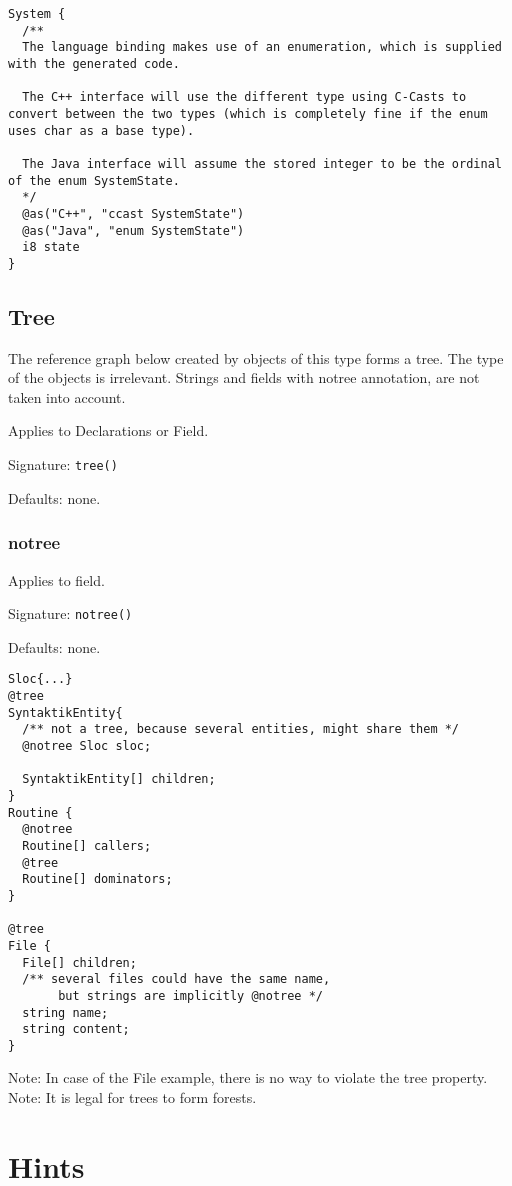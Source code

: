 \documentclass[a4paper,10pt]{article}
\begin{document}
\begin{lstlisting}[label=ascriptionExample,caption=Examples,language=skill]
System {
  /**
  The language binding makes use of an enumeration, which is supplied with the generated code.
  
  The C++ interface will use the different type using C-Casts to convert between the two types (which is completely fine if the enum uses char as a base type).
  
  The Java interface will assume the stored integer to be the ordinal of the enum SystemState.
  */
  @as("C++", "ccast SystemState")
  @as("Java", "enum SystemState")
  i8 state
}
\end{lstlisting}



\subsection*{Tree}
The reference graph below created by objects of this type forms a tree. The type of the objects is irrelevant. Strings and fields with notree annotation, are not taken into account.

Applies to Declarations or Field.

Signature: \verb/tree()/

Defaults: none.


\subsubsection*{notree}
Applies to field.

Signature: \verb/notree()/

Defaults: none.

\begin{lstlisting}[label=treeExample,caption=Examples,language=skill]
Sloc{...}
@tree
SyntaktikEntity{
  /** not a tree, because several entities, might share them */
  @notree Sloc sloc;
  
  SyntaktikEntity[] children;
}
Routine {
  @notree
  Routine[] callers;
  @tree
  Routine[] dominators;
}

@tree
File {
  File[] children;
  /** several files could have the same name,
       but strings are implicitly @notree */
  string name;
  string content;
} 
\end{lstlisting}
Note: In case of the File example, there is no way to violate the tree property.
Note: It is legal for trees to form forests.


\section{Hints}
\label{hints}
\end{document}
